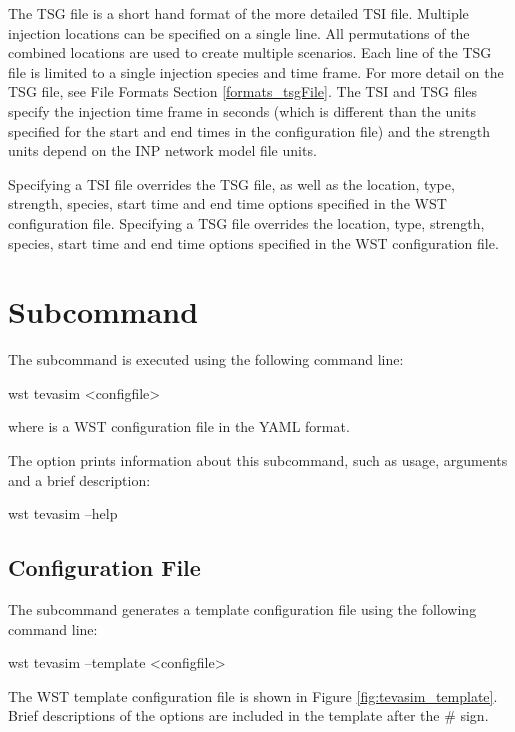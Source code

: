 The TSG file is a short hand format of the more detailed TSI file. 
Multiple injection locations can be specified on a single line. All permutations of the 
combined locations are used to create multiple scenarios. Each line of the TSG file is limited 
to a single injection species and time frame. For more detail on the TSG file, see File Formats Section \ref{formats_tsgFile}.
The TSI and TSG files specify the injection time frame in seconds (which is different than 
the units specified for the start and end times in the configuration file) and 
the strength units depend on the INP network model file units. 

Specifying a TSI file overrides the TSG file, as well as the location, 
type, strength, species, start time and end time options specified in the WST configuration file.  
Specifying a TSG file overrides the location, type, strength, species, start time and 
end time options specified in the WST configuration file.   

\section{ Subcommand}

The  subcommand is executed using the following command line:
\begin{unknownListing}
wst tevasim <configfile> 
\end{unknownListing}
where  is a WST configuration file in the YAML format.  

The  option prints information about this subcommand, such as usage,
arguments and a brief description:

\begin{unknownListing}
wst tevasim --help
\end{unknownListing}

\subsection{Configuration File}

The  subcommand generates a template configuration file using the following command line:

\begin{unknownListing}
wst tevasim --template <configfile>
\end{unknownListing}

The  WST template configuration file is shown in Figure \ref{fig:tevasim_template}. Brief descriptions 
of the options are included in the template after the \# sign.  

